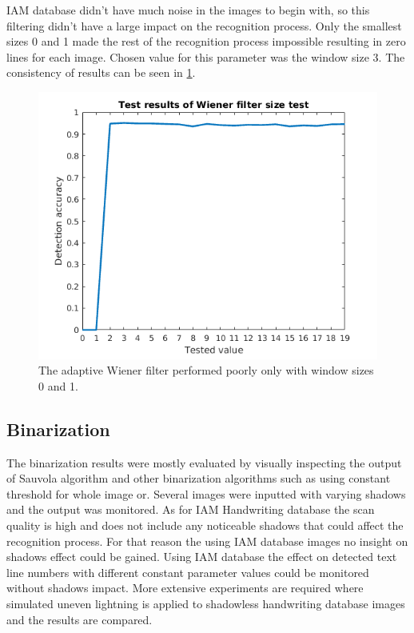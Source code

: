 \documentclass{article}
\begin{document}
    IAM database didn't have much noise in the images to begin with, so this filtering didn't have a large impact on the recognition process. Only the smallest sizes 0 and 1 made the rest of the recognition process impossible resulting in zero lines for each image. Chosen value for this parameter was the window size 3. The consistency of results can be seen in \ref{fig:wienertest}.

    \begin{figure}[!ht]
      \centering
      \includegraphics[natwidth=554, natheight=436, scale=0.45]{wiener_graph.png}
      \caption{The adaptive Wiener filter performed poorly only with window sizes 0 and 1.
      \label{fig:wienertest}}
    \end{figure}

  \subsection{Binarization}
    The binarization results were mostly evaluated by visually inspecting the output of Sauvola algorithm and other binarization algorithms such as using constant threshold for whole image or. Several images were inputted with varying shadows and the output was monitored. As for IAM Handwriting database the scan quality is high and does not include any noticeable shadows that could affect the recognition process. For that reason the using IAM database images no insight on shadows effect could be gained. Using IAM database the effect on detected text line numbers with different constant parameter values could be monitored without shadows impact. More extensive experiments are required where simulated uneven lightning is applied to shadowless handwriting database images and the results are compared.
\end{document}
